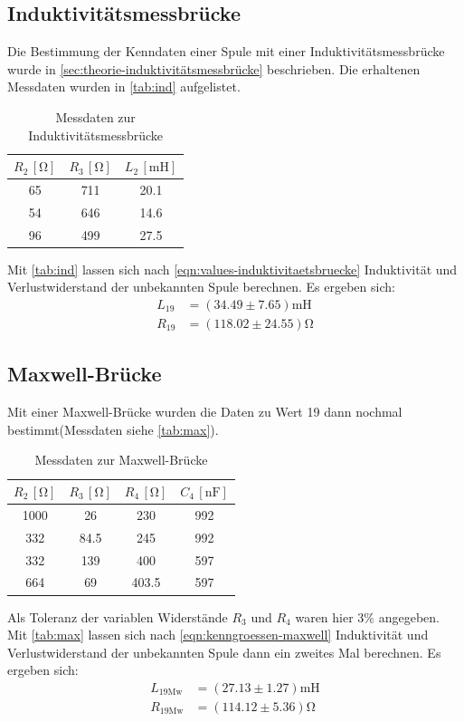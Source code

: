 \subsection{Induktivitätsmessbrücke}
 Die Bestimmung der Kenndaten einer Spule mit einer Induktivitätsmessbrücke wurde in \autoref{sec:theorie-induktivitätsmessbrücke} beschrieben. Die erhaltenen Messdaten wurden in \autoref{tab:ind} aufgelistet.
\begin{table}
  \centering
  \caption{Messdaten zur Induktivitätsmessbrücke}
  \label{tab:ind}
  \begin{tabular}{c c c}
  \toprule
  $R_2 \, [\si{\ohm}]$ &$R_3 \, [\si{\ohm}]$ &$L_2 \, [\si{\milli} \si{\henry}]$\\
  \midrule
   65 & 711 & 20.1\\
   54 & 646 & 14.6 \\
   96 & 499 & 27.5 \\
  \bottomrule
  \end{tabular}
\end{table}
Mit  \autoref{tab:ind} lassen sich nach \autoref{eqn:values-induktivitaetsbruecke} Induktivität und Verlustwiderstand der unbekannten Spule berechnen. Es ergeben sich:
\begin{align}
  L_{19}&=(34.49 \pm 7.65)\si{\milli} \si{\henry}\\
  R_{19}&=(118.02 \pm 24.55)\si{\ohm}
\end{align}

\subsection{Maxwell-Brücke}
Mit einer Maxwell-Brücke wurden die Daten zu Wert 19 dann nochmal bestimmt(Messdaten siehe \autoref{tab:max}). 
\begin{table}
  \centering
  \caption{Messdaten zur Maxwell-Brücke}
  \label{tab:max}
  \begin{tabular}{c c c c}
  \toprule
  $R_2 \, [\si{\ohm}]$ &$R_3 \, [\si{\ohm}]$ &$R_4 \, [\si{\ohm}]$&$C_4 \, [\si{\nano} \si{\farad}]$\\
  \midrule
  1000 & 26 & 230 & 992\\
  332  & 84.5 & 245 & 992\\
  332 & 139 & 400 & 597\\
  664 & 69 & 403.5 & 597\\
  \bottomrule
  \end{tabular}
\end{table}
Als Toleranz der variablen Widerstände $R_3$ und $R_4$ waren hier $3\%$ angegeben.
Mit  \autoref{tab:max} lassen sich nach \autoref{eqn:kenngroessen-maxwell} Induktivität und Verlustwiderstand der unbekannten Spule dann ein zweites Mal berechnen. Es ergeben sich:
\begin{align}
  L_{19 \text{Mw}}&=(27.13 \pm 1.27)\si{\milli} \si{\henry}\\
  R_{19 \text{Mw}}&=(114.12 \pm 5.36)\si{\ohm}
\end{align}


